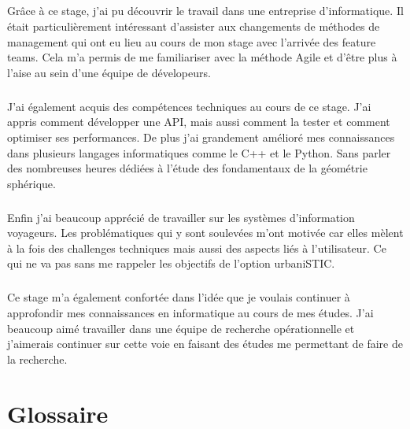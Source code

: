 \documentclass[a4paper]{report}
\begin{document}
\paragraph{} Grâce à ce stage, j'ai pu découvrir le travail dans une entreprise d'informatique. Il était particulièrement intéressant d'assister aux changements de méthodes de management qui ont eu lieu au cours de mon stage avec l'arrivée des feature teams. Cela m'a permis de me familiariser avec la méthode Agile et d'être plus à l'aise au sein d'une équipe de dévelopeurs.

\paragraph{} J'ai également acquis des compétences techniques au cours de ce stage. J'ai appris comment développer une API, mais aussi comment la tester et comment optimiser ses performances. De plus j'ai grandement amélioré mes connaissances dans plusieurs langages informatiques comme le C++ et le Python. Sans parler des nombreuses heures dédiées à l'étude des fondamentaux de la géométrie sphérique.

\paragraph{} Enfin j'ai beaucoup apprécié de travailler sur les systèmes d'information voyageurs. Les problématiques qui y sont soulevées m'ont motivée car elles mèlent à la fois des challenges techniques mais aussi des aspects liés à l'utilisateur. Ce qui ne va pas sans me rappeler les objectifs de l'option urbaniSTIC. 

\paragraph{} Ce stage m'a également confortée dans l'idée que je voulais continuer à approfondir mes connaissances en informatique au cours de mes études. J'ai beaucoup aimé travailler dans une équipe de recherche opérationnelle et j'aimerais continuer sur cette voie en faisant des études me permettant de faire de la recherche.

\chapter*{Glossaire}
\end{document}
